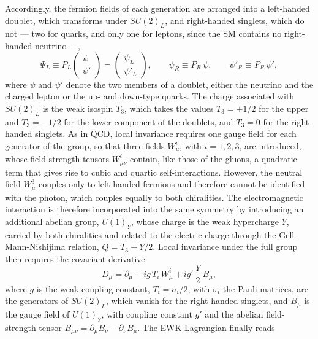 Accordingly, the fermion fields of each generation are arranged into a left-handed doublet, which transforms under $SU(2)_L$, and right-handed singlets, which do not — two for quarks, and only one for leptons, since the SM contains no right-handed neutrino —,
\begin{equation}
    \Psi_L \equiv P_L\begin{pmatrix}\psi \\ \psi'\end{pmatrix}=\begin{pmatrix}\psi_L \\ \psi'_L\end{pmatrix}, \qquad
    \psi_R \equiv P_R\,\psi, \qquad
    \psi'_R \equiv P_R\,\psi',
    \label{fermionic_fields}
\end{equation}
%
where $\psi$ and $\psi'$ denote the two members of a doublet, either the neutrino and the charged lepton or the up- and down-type quarks. The charge associated with $SU(2)_L$ is the weak isospin $T_3$, which takes the values $T_3=+1/2$ for the upper and $T_3=-1/2$ for the lower component of the doublets, and $T_3=0$ for the right-handed singlets. As in QCD, local invariance requires one gauge field for each generator of the group, so that three fields $W^i_\mu$, with $i=1,2,3$, are introduced, whose field-strength tensors $W^i_{\mu\nu}$ contain, like those of the gluons, a quadratic term that gives rise to cubic and quartic self-interactions. However, the neutral field $W^3_\mu$ couples only to left-handed fermions and therefore cannot be identified with the photon, which couples equally to both chiralities. The electromagnetic interaction is therefore incorporated into the same symmetry by introducing an additional abelian group, $U(1)_Y$, whose charge is the weak hypercharge $Y$, carried by both chiralities and related to the electric charge through the Gell-Mann-Nishijima relation, $Q = T_3 + Y/2$. Local invariance under the full group then requires the covariant derivative
\begin{equation}
    D_\mu = \partial_\mu + i g\, T_i\, W^i_\mu + i g'\, \frac{Y}{2}\, B_\mu,
    \label{eq:ew_covariant_derivative}
\end{equation}
%
where $g$ is the weak coupling constant, $T_i = \sigma_i/2$, with $\sigma_i$ the Pauli matrices, are the generators of $SU(2)_L$, which vanish for the right-handed singlets, and $B_\mu$ is the gauge field of $U(1)_Y$, with coupling constant $g'$ and the abelian field-strength tensor $B_{\mu\nu} = \partial_\mu B_\nu - \partial_\nu B_\mu$. The EWK Lagrangian finally reads
